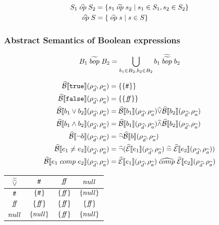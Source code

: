 \begin{align}
    S_1 \;\widehat{op}\; S_2 &= \{ s_1 \;\widetilde{op}\; s_2 \mid s_1 \in S_1, s_2 \in S_2 \} \\
    \;\widehat{op}\; S &= \{\;\widetilde{op}\; s \mid s \in S \}
\end{align}

\subsubsection{Abstract Semantics of Boolean expressions}

\begin{align}
    B_1 \;\widetilde{bop}\; B_2 = \bigcup_{b_1 \in B_2, b_2 \in B_2} b_1 \;\widetilde{\widetilde{bop}}\; b_2
\end{align}

\begin{align}
    \widehat{\mathcal{B}}\llbracket \texttt{true} \rrbracket(\rho_{\widehat{d}}, \rho_{\widehat{a}}) &= \{\{t\!t\}\} \\
    \widehat{\mathcal{B}}\llbracket \texttt{false} \rrbracket(\rho_{\widehat{d}}, \rho_{\widehat{a}}) &= \{\{f\!\!f\}\} \\
    \widehat{\mathcal{B}}\llbracket b_1 \lor b_2 \rrbracket(\rho_{\widehat{d}}, \rho_{\widehat{a}}) &= \widehat{\mathcal{B}}\llbracket b_1 \rrbracket(\rho_{\widehat{d}}, \rho_{\widehat{a}}) \widehat{\lor} \widehat{\mathcal{B}}\llbracket b_2 \rrbracket(\rho_{\widehat{d}}, \rho_{\widehat{a}}) \\
    \widehat{\mathcal{B}}\llbracket b_1 \land b_2 \rrbracket(\rho_{\widehat{d}}, \rho_{\widehat{a}}) &= \widehat{\mathcal{B}}\llbracket b_1 \rrbracket(\rho_{\widehat{d}}, \rho_{\widehat{a}}) \widehat{\land} \widehat{\mathcal{B}}\llbracket b_2 \rrbracket(\rho_{\widehat{d}}, \rho_{\widehat{a}}) \\
    \widehat{\mathcal{B}}\llbracket \neg b \rrbracket(\rho_{\widehat{d}}, \rho_{\widehat{a}}) &= \widehat{\neg} \widehat{\mathcal{B}}\llbracket b \rrbracket(\rho_{\widehat{d}}, \rho_{\widehat{a}}) \\
    \widehat{\mathcal{B}}\llbracket e_1 \neq e_2 \rrbracket(\rho_{\widehat{d}}, \rho_{\widehat{a}}) &= \widehat{\neg}(\widehat{\mathcal{E}}\llbracket e_1 \rrbracket(\rho_{\widehat{d}}, \rho_{\widehat{a}}) \;\widehat{=}\; \widehat{\mathcal{E}}\llbracket e_2 \rrbracket(\rho_{\widehat{d}}, \rho_{\widehat{a}})) \\
    \widehat{\mathcal{B}}\llbracket e_1 \;comp\; e_2 \rrbracket(\rho_{\widehat{d}}, \rho_{\widehat{a}}) &= \widehat{\mathcal{E}}\llbracket e_1 \rrbracket(\rho_{\widehat{d}}, \rho_{\widehat{a}}) \;\widehat{comp}\; \widehat{\mathcal{E}}\llbracket e_2 \rrbracket(\rho_{\widehat{d}}, \rho_{\widehat{a}}) \\
\end{align}

\begin{table}[H]
    \centering
    \begin{tabular}{c|ccc}
        $\widetilde{\widetilde{\lor}}$ & $t\!t$ & $f\!\!f$ & $null$ \\
        \hline
        $t\!t$ & $\{t\!t\}$ & $\{f\!\!f\}$ & $\{null\}$ \\
        $f\!\!f$ & $\{f\!\!f\}$ & $\{f\!\!f\}$ & $\{f\!\!f\}$ \\
        $null$ & $\{null\}$ & $\{f\!\!f\}$ & $\{null\}$ \\
    \end{tabular}
    \label{tab:aaablor}
\end{table}

